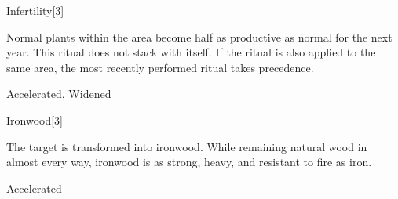 \begin{spellsection}{Infertility}[3]
\begin{spellcontent}
\begin{spelltargetinginfo}
\end{spelltargetinginfo}
\begin{spelleffects}
\spelleffect
Normal plants within the area become half as productive as normal for the next year.
This ritual does not stack with itself.
If the  ritual is also applied to the same area, the most recently performed ritual takes precedence.
\end{spelleffects}
\end{spellcontent}
\begin{spellfooter}
 Accelerated, Widened
\end{spellfooter}
\begin{spellsubcontent}
\end{spellsubcontent}
\end{spellsection}
\begin{spellsection}{Ironwood}[3]
\begin{spellcontent}
\begin{spelltargetinginfo}
\end{spelltargetinginfo}
\begin{spelleffects}
\spelleffect
The target is transformed into ironwood.
While remaining natural wood in almost every way, ironwood is as strong, heavy, and resistant to fire as iron.
\end{spelleffects}
\end{spellcontent}
\begin{spellfooter}
 Accelerated
\end{spellfooter}
\begin{spellsubcontent}
\end{spellsubcontent}
\end{spellsection}
